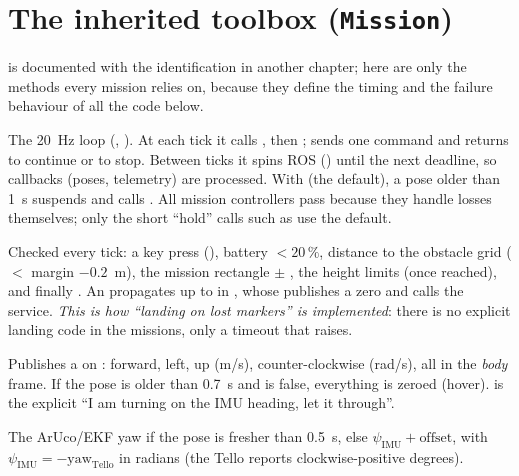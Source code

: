 \section{The inherited toolbox (\texorpdfstring{\texttt{Mission}}{Mission})}

 is documented with the identification in another chapter; here are only the methods every mission
relies on, because they define the timing and the failure behaviour of all the code below.

The 20~Hz loop (, ). At each tick it calls , then
;  sends one command and returns  to continue or  to stop. Between
ticks it spins ROS () until the next deadline, so callbacks (poses, telemetry) are
processed. With  (the default), a pose older than 1~s suspends  and calls
. All mission controllers pass  because they handle
losses themselves; only the short ``hold'' calls such as  use the
default.

Checked every tick: a key press (), battery $<20\,\%$, distance to the obstacle grid
($<$ margin $-0.2$~m), the mission rectangle  $\pm$ , the height limits (once
reached), and finally . An  propagates up to  in
, whose  publishes a zero  and calls the  service.
\emph{This is how ``landing on lost markers'' is implemented}: there is no explicit landing code in the
missions, only a timeout that raises.

Publishes a  on :  forward,  left,
 up (m/s),  counter-clockwise (rad/s), all in the \emph{body} frame. If the pose is
older than 0.7~s and  is false, everything is zeroed (hover).  is the explicit
``I am turning on the IMU heading, let it through''.

The ArUco/EKF yaw if the pose is fresher than 0.5~s, else $\psi_{\text{IMU}} + \text{offset}$, with
$\psi_{\text{IMU}} = -\text{yaw}_{\text{Tello}}$ in radians (the Tello reports clockwise-positive degrees).

